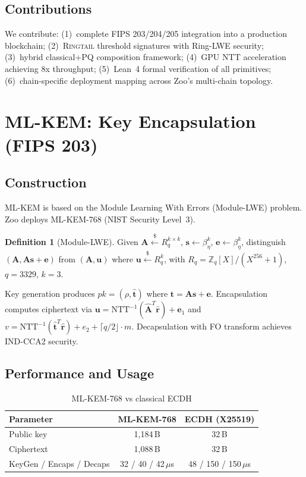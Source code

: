 \documentclass[11pt,letterpaper]{article}
\theoremstyle{definition}
\newtheorem{definition}{Definition}
\theoremstyle{remark}
\newcommand{\Ringtail}{\textsc{Ringtail}}
\newcommand{\MLKEM}{\textsc{ML-KEM}}
\begin{document}
\subsection{Contributions}

We contribute: (1)~complete FIPS 203/204/205 integration into a production blockchain; (2)~\Ringtail{} threshold signatures with Ring-LWE security; (3)~hybrid classical+PQ composition framework; (4)~GPU NTT acceleration achieving 8x throughput; (5)~Lean~4 formal verification of all primitives; (6)~chain-specific deployment mapping across Zoo's multi-chain topology.

\section{ML-KEM: Key Encapsulation (FIPS 203)}

\subsection{Construction}

\MLKEM{} is based on the Module Learning With Errors (Module-LWE) problem. Zoo deploys \MLKEM{}-768 (NIST Security Level~3).

\begin{definition}[Module-LWE]
Given $\mathbf{A} \xleftarrow{\$} R_q^{k \times k}$, $\mathbf{s} \leftarrow \beta_\eta^k$, $\mathbf{e} \leftarrow \beta_\eta^k$, distinguish $(\mathbf{A}, \mathbf{A}\mathbf{s} + \mathbf{e})$ from $(\mathbf{A}, \mathbf{u})$ where $\mathbf{u} \xleftarrow{\$} R_q^k$, with $R_q = \mathbb{Z}_q[X]/(X^{256} + 1)$, $q = 3329$, $k = 3$.
\end{definition}

Key generation produces $pk = (\rho, \hat{\mathbf{t}})$ where $\mathbf{t} = \mathbf{A}\mathbf{s} + \mathbf{e}$. Encapsulation computes ciphertext via $\mathbf{u} = \text{NTT}^{-1}(\hat{\mathbf{A}}^T \hat{\mathbf{r}}) + \mathbf{e}_1$ and $v = \text{NTT}^{-1}(\hat{\mathbf{t}}^T \hat{\mathbf{r}}) + e_2 + \lceil q/2 \rfloor \cdot m$. Decapsulation with FO transform achieves IND-CCA2 security.

\subsection{Performance and Usage}

\begin{table}[h]
\centering
\begin{tabular}{lcc}
\toprule
\textbf{Parameter} & \textbf{ML-KEM-768} & \textbf{ECDH (X25519)} \\
\midrule
Public key & 1,184\,B & 32\,B \\
Ciphertext & 1,088\,B & 32\,B \\
KeyGen / Encaps / Decaps & 32 / 40 / 42\,$\mu$s & 48 / 150 / 150\,$\mu$s \\
\bottomrule
\end{tabular}
\caption{\MLKEM{}-768 vs classical ECDH}
\label{tab:mlkem-perf}
\end{table}
\end{document}
